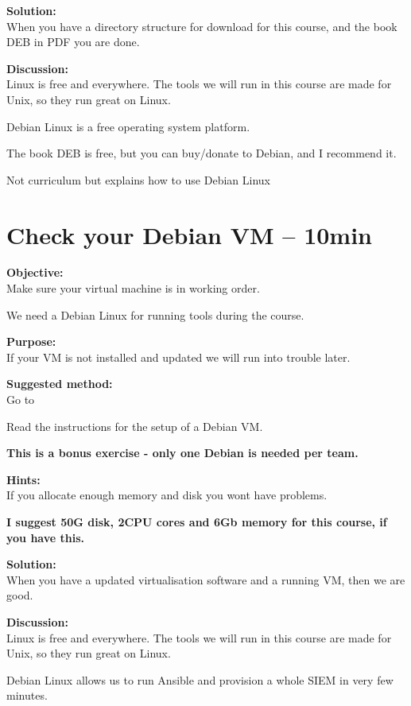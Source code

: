 \documentclass[a4paper,11pt,notitlepage]{report}
\begin{document}
{\bf Solution:}\\
When you have a directory structure for download for this course, and the book DEB in PDF you are done.

{\bf Discussion:}\\
Linux is free and everywhere. The tools we will run in this course are made for Unix, so they run great on Linux.

Debian Linux is a free operating system platform.

The book DEB is free, but you can buy/donate to Debian, and I recommend it.

Not curriculum but explains how to use Debian Linux


\chapter{Check your Debian VM -- 10min}
\label{ex:sw-basicDebianVM}


{\bf Objective:}\\
Make sure your virtual machine is in working order.

We need a Debian Linux for running tools during the course.

{\bf Purpose:}\\
If your VM is not installed and updated we will run into trouble later.

{\bf Suggested method:}\\
Go to 

Read the instructions for the setup of a Debian VM.

{\Large \bf This is a bonus exercise - only one Debian is needed per team.}

{\bf Hints:}\\
If you allocate enough memory and disk you wont have problems.

{\bf I suggest 50G disk, 2CPU cores and 6Gb memory for this course, if you have this.}

{\bf Solution:}\\
When you have a updated virtualisation software and a running VM, then we are good.

{\bf Discussion:}\\
Linux is free and everywhere. The tools we will run in this course are made for Unix, so they run great on Linux.

Debian Linux allows us to run Ansible and provision a whole SIEM in very few minutes.
\end{document}
